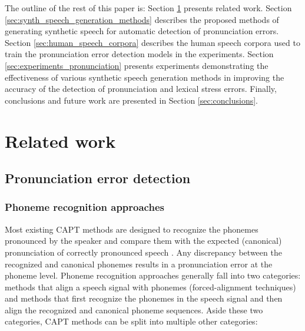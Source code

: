 \documentclass[]{interact}
\theoremstyle{plain}%
\theoremstyle{definition}
\theoremstyle{remark}
\begin{document}
The outline of the rest of this paper is: Section \ref{sec:related_work} presents related work. Section \ref{sec:synth_speech_generation_methods} describes the proposed methods of generating synthetic speech for automatic detection of pronunciation errors. Section \ref{sec:human_speech_corpora} describes the human speech corpora used to train the pronunciation error detection models in the experiments. Section \ref{sec:experiments_pronunciation} presents experiments demonstrating the effectiveness of various synthetic speech generation methods in improving the accuracy of the detection of pronunciation and lexical stress errors. Finally, conclusions and future work are presented in Section \ref{sec:conclusions}.

\section{Related work}
\label{sec:related_work}

\subsection{Pronunciation error detection}

\subsubsection{Phoneme recognition approaches} 

Most existing CAPT methods are designed to recognize the phonemes pronounced by the speaker and compare them with the expected (canonical) pronunciation of correctly pronounced speech \cite{witt2000phone,li2016mispronunciation,sudhakara2019improved,leung2019cnn}. Any discrepancy between the recognized and canonical phonemes results in a pronunciation error at the phoneme level. Phoneme recognition approaches generally fall into two categories: methods that align a speech signal with phonemes (forced-alignment techniques) and methods that first recognize the phonemes in the speech signal and then align the recognized and canonical phoneme sequences. Aside these two categories, CAPT methods can be split into multiple other categories:
\end{document}
